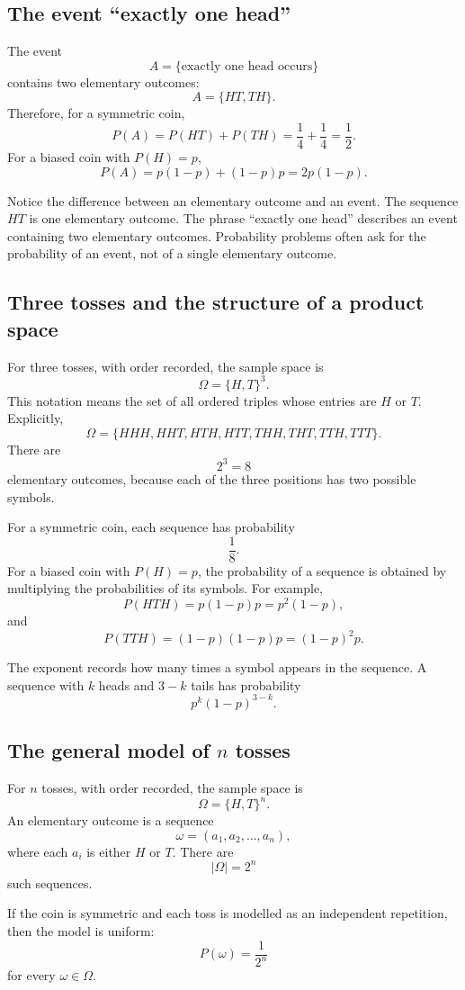 \subsection*{The event ``exactly one head''}

The event
\[
A=\{\text{exactly one head occurs}\}
\]
contains two elementary outcomes:
\[
A=\{HT,TH\}.
\]
Therefore, for a symmetric coin,
\[
P(A)=P(HT)+P(TH)=\frac14+\frac14=\frac12.
\]
For a biased coin with \(P(H)=p\),
\[
P(A)=p(1-p)+(1-p)p=2p(1-p).
\]

Notice the difference between an elementary outcome and an event. The sequence
\(HT\) is one elementary outcome. The phrase ``exactly one head'' describes an
event containing two elementary outcomes. Probability problems often ask for the
probability of an event, not of a single elementary outcome.

\subsection*{Three tosses and the structure of a product space}

For three tosses, with order recorded, the sample space is
\[
\Omega=\{H,T\}^3.
\]
This notation means the set of all ordered triples whose entries are \(H\) or
\(T\). Explicitly,
\[
\Omega=\{HHH,HHT,HTH,HTT,THH,THT,TTH,TTT\}.
\]
There are
\[
2^3=8
\]
elementary outcomes, because each of the three positions has two possible
symbols.

For a symmetric coin, each sequence has probability
\[
\frac18.
\]
For a biased coin with \(P(H)=p\), the probability of a sequence is obtained by
multiplying the probabilities of its symbols. For example,
\[
P(HTH)=p(1-p)p=p^2(1-p),
\]
and
\[
P(TTH)=(1-p)(1-p)p=(1-p)^2p.
\]

The exponent records how many times a symbol appears in the sequence. A sequence
with \(k\) heads and \(3-k\) tails has probability
\[
p^k(1-p)^{3-k}.
\]

\subsection*{The general model of \(n\) tosses}

For \(n\) tosses, with order recorded, the sample space is
\[
\Omega=\{H,T\}^n.
\]
An elementary outcome is a sequence
\[
\omega=(a_1,a_2,\ldots,a_n),
\]
where each \(a_i\) is either \(H\) or \(T\). There are
\[
|\Omega|=2^n
\]
such sequences.

If the coin is symmetric and each toss is modelled as an independent repetition,
then the model is uniform:
\[
P(\omega)=\frac1{2^n}
\]
for every \(\omega\in\Omega\).


